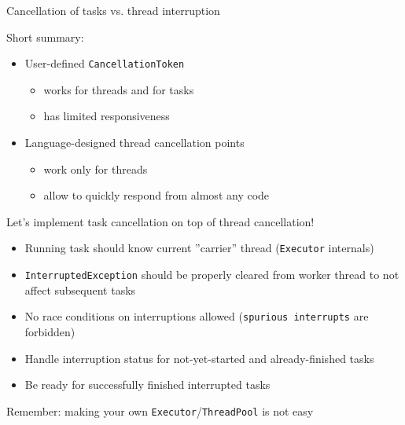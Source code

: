 \begin{frame}[t]{Cancellation of tasks vs. thread interruption}

Short summary:
\begin{itemize}
    \item User-defined \texttt{CancellationToken} 
    \begin{itemize}
        \item works for threads and for tasks
        \item has limited responsiveness
    \end{itemize}
    \item Language-designed thread cancellation points 
    \begin{itemize}
        \item work only for threads
        \item allow to quickly respond from almost any code
    \end{itemize}
\end{itemize}

\pause
Let's implement task cancellation on top of thread cancellation!

\pause

\begin{itemize}
    \item Running task should know current ''carrier'' thread (\texttt{Executor} internals)
    \item \texttt{InterruptedException} should be properly cleared from worker thread to not affect subsequent tasks
    \item No race conditions on interruptions allowed (\texttt{spurious interrupts} are forbidden)
    \item Handle interruption status for not-yet-started and already-finished tasks
    \item Be ready for successfully finished interrupted tasks 
\end{itemize}

\pause
Remember: making your own \texttt{Executor}/\texttt{ThreadPool} is not easy

\end{frame}


